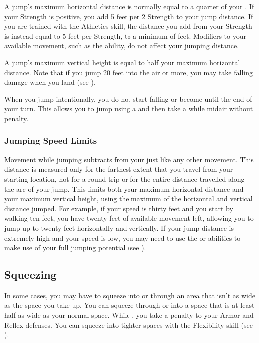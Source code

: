     A jump's maximum horizontal distance is normally equal to a quarter of your .
    If your Strength is positive, you add 5 feet per 2 Strength to your jump distance.
    If you are trained with the Athletics skill, the distance you add from your Strength is instead equal to 5 feet per Strength, to a minimum of  feet.
    Modifiers to your available movement, such as the  ability, do not affect your jumping distance.

    A jump's maximum vertical height is equal to half your maximum horizontal distance.
    Note that if you jump 20 feet into the air or more, you may take falling damage when you land (see ).

    When you jump intentionally, you do not start falling or become \unsteady until the end of your turn.
    This allows you to jump using a  and then take a  while midair without penalty.

    \subsubsection{Jumping Speed Limits}
      Movement while jumping subtracts from your  just like any other movement.
      This distance is measured only for the farthest extent that you travel from your starting location, not for a round trip or for the entire distance travelled along the arc of your jump.
      This limits both your maximum horizontal distance and your maximum vertical height, using the maximum of the horizontal and vertical distance jumped.
      For example, if your speed is thirty feet and you start by walking ten feet, you have twenty feet of available movement left, allowing you to jump up to twenty feet horizontally and vertically.
      If your jump distance is extremely high and your speed is low, you may need to use the  or  abilities to make use of your full jumping potential (see ).

  \subsection{Squeezing}\label{Squeezing}
    In some cases, you may have to squeeze into or through an area that isn't as wide as the space you take up.
    You can squeeze through or into a space that is at least half as wide as your normal space.
    While \squeezing, you take a  penalty to your Armor and Reflex defenses.
    You can squeeze into tighter spaces with the Flexibility skill (see ).


